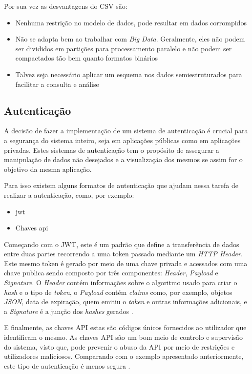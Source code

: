 Por sua vez as desvantagens do CSV são:
\begin{itemize}
    \item Nenhuma restrição no modelo de dados, pode resultar em dados corrompidos
    \item Não se adapta bem ao trabalhar com \textit{Big Data}. Geralmente, eles não podem ser divididos em partições para processamento paralelo e não podem ser compactados tão bem quanto formatos binários
    \item Talvez seja necessário aplicar um esquema nos dados semiestruturados para facilitar a consulta e análise \cite{csvDesvantagenseInfo}
\end{itemize}

\subsection{Autenticação}
A decisão de fazer a implementação de um sistema de autenticação é crucial para a segurança do sistema inteiro, seja em aplicações públicas como em aplicações privadas. Estes sistemas de autenticação tem o propósito de assegurar a manipulação de dados não desejados e a visualização dos mesmos se assim for o objetivo da mesma aplicação. 

Para isso existem alguns formatos de autenticação que ajudam nessa tarefa de realizar a autenticação, como, por exemplo:
\begin{itemize}
    \item \ac{jwt}
    \item Chaves \ac{api}
\end{itemize}

Começando com o JWT, este é um padrão que define a transferência de dados entre duas partes recorrendo a uma token passado mediante um \textit{HTTP Header}. Este mesmo token é gerado por meio de uma chave privada e acessados com uma chave publica sendo composto por três componentes: \textit{Header}, \textit{Payload} e \textit{Signature}. O \textit{Header} contém informações sobre o algoritmo usado para criar o \textit{hash} e o tipo de \textit{token}, o \textit{Payload} contém \textit{claims} como, por exemplo, objetos \textit{JSON}, data de expiração, quem emitiu o \textit{token} e outras informações adicionais, e a \textit{Signature} é a junção dos \textit{hashes} gerados \cite{jwt}.

E finalmente, as chaves API estas são códigos únicos fornecidos ao utilizador que identificam o mesmo. As chaves API são um bom meio de controlo e supervisão do sistema, visto que, pode prevenir o abuso da API por meio de restrições e utilizadores maliciosos. Comparando com o exemplo apresentado anteriormente, este tipo de autenticação é menos segura \cite{apikeys}.

